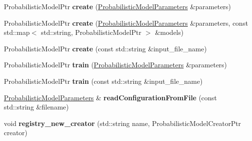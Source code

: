 \begin{DoxyCompactItemize}
\item 
\mbox{\label{classtops_1_1ProbabilisticModelCreatorClient_ab72511c606dee9c76172c9de596473dd}} 
Probabilistic\+Model\+Ptr {\bfseries create} (\hyperlink{classtops_1_1ProbabilisticModelParameters}{Probabilistic\+Model\+Parameters} \&parameters)
\item 
\mbox{\label{classtops_1_1ProbabilisticModelCreatorClient_aa7af63ad3e36d56fc3ca95e7ca897dab}} 
Probabilistic\+Model\+Ptr {\bfseries create} (\hyperlink{classtops_1_1ProbabilisticModelParameters}{Probabilistic\+Model\+Parameters} \&parameters, const std\+::map$<$ std\+::string, Probabilistic\+Model\+Ptr $>$ \&models)
\item 
\mbox{\label{classtops_1_1ProbabilisticModelCreatorClient_ad0c3a15a2975a130f0a9cb80be8c6c87}} 
Probabilistic\+Model\+Ptr {\bfseries create} (const std\+::string \&input\+\_\+file\+\_\+name)
\item 
\mbox{\label{classtops_1_1ProbabilisticModelCreatorClient_a2908125b1e1dd8c5efd5d1c6c1d506dd}} 
Probabilistic\+Model\+Ptr {\bfseries train} (\hyperlink{classtops_1_1ProbabilisticModelParameters}{Probabilistic\+Model\+Parameters} \&parameters)
\item 
\mbox{\label{classtops_1_1ProbabilisticModelCreatorClient_accc336019d2e80d5a4ef6d525e62dd11}} 
Probabilistic\+Model\+Ptr {\bfseries train} (const std\+::string \&input\+\_\+file\+\_\+name)
\item 
\mbox{\label{classtops_1_1ProbabilisticModelCreatorClient_af770af84bd0ef4a3d62bca172b8b529e}} 
\hyperlink{classtops_1_1ProbabilisticModelParameters}{Probabilistic\+Model\+Parameters} \& {\bfseries read\+Configuration\+From\+File} (const std\+::string \&filename)
\item 
\mbox{\label{classtops_1_1ProbabilisticModelCreatorClient_a0b8139f37c56556da11489e27d8c7c76}} 
void {\bfseries registry\+\_\+new\+\_\+creator} (std\+::string name, Probabilistic\+Model\+Creator\+Ptr creator)

\end{DoxyCompactItemize}
